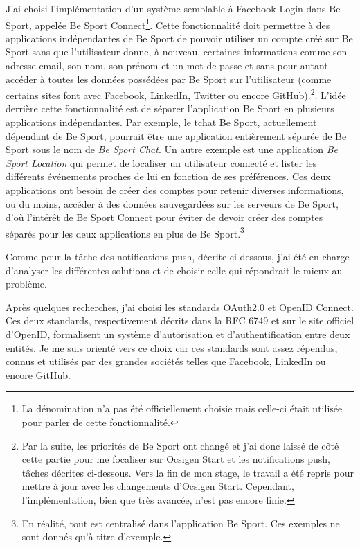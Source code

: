 J'ai choisi l'implémentation d'un système semblable à Facebook
Login\cite{facebook-login} dans Be Sport, appelée Be Sport Connect\footnote{La dénomination n'a pas été officiellement
  choisie mais celle-ci était utilisée pour parler de cette fonctionnalité.}.
Cette fonctionnalité doit permettre à des applications indépendantes de Be Sport
de pouvoir utiliser un compte créé sur Be Sport sans que l'utilisateur donne, à
nouveau, certaines informations comme son adresse email, son nom, son prénom et
un mot de passe et sans pour autant accéder à
toutes les données possédées par Be Sport sur l'utilisateur (comme certains
sites font avec Facebook, LinkedIn, Twitter ou encore GitHub).\footnote{Par la
suite, les
  priorités de Be Sport ont changé
  et j'ai donc laissé de côté cette partie pour me focaliser sur Ocsigen Start
  et les notifications push, tâches décrites ci-dessous. Vers la fin de mon
  stage, le travail a été repris pour mettre à jour avec les changements
  d'Ocsigen Start. Cependant, l'implémentation, bien que très avancée, n'est pas
encore finie.}.
L'idée derrière cette fonctionnalité est de séparer l'application Be Sport en
plusieurs applications indépendantes. Par exemple, le tchat Be Sport, actuellement
dépendant de Be Sport, pourrait être une application entièrement séparée de Be
Sport sous le nom de \emph{Be Sport Chat}. Un autre exemple est une application
\emph{Be Sport Location} qui permet de localiser un utilisateur connecté et
lister les différents événements proches de lui en fonction de ses préférences. Ces deux applications ont
besoin de créer des comptes pour retenir diverses informations, ou du moins,
accéder à des données sauvegardées sur les serveurs de Be Sport, d'où l'intérêt
de Be Sport Connect pour éviter de devoir créer des comptes séparés pour les
deux applications en plus de Be Sport.\footnote{En réalité, tout est centralisé
  dans l'application Be Sport. Ces exemples ne sont donnés qu'à titre d'exemple.}

Comme pour la tâche des notifications push, décrite ci-dessous, j'ai été en
charge d'analyser les différentes solutions et de choisir celle qui répondrait
le mieux au problème.

Après quelques recherches, j'ai choisi les standards OAuth2.0 et OpenID Connect.
Ces deux standards, respectivement décrits dans la RFC 6749 et sur le site
officiel d'OpenID, formalisent un système d'autorisation et d'authentification
entre deux entités. Je me suis orienté vers ce choix car ces standards sont
assez répendus, connus et utilisés par des grandes sociétés telles que Facebook,
LinkedIn ou encore GitHub.

